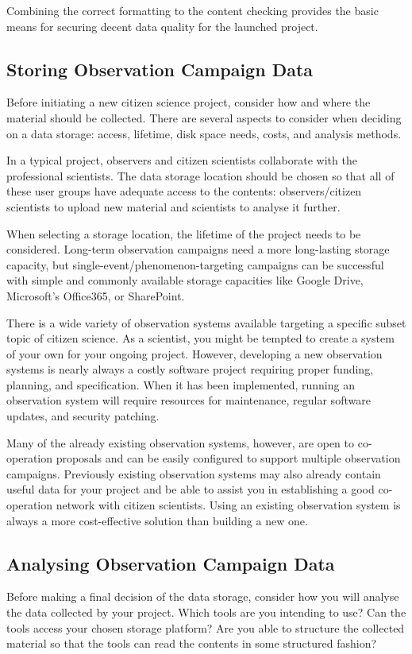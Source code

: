 \documentclass{article}
\newcommand{\contributed}[1]{%
    \par\noindent
    \begingroup
    \setlength{\leftskip}{1em}%
    \itshape
    Contributors: #1
    \par
    \endgroup
    \vspace{0.5em}
}
\begin{document}
Combining the correct formatting to the content checking provides the basic means for securing decent data quality for the launched project.

\subsection{Storing Observation Campaign Data}\label{data_storage}
Before initiating a new citizen science project, consider how and where the material should be collected. There are several aspects to consider when deciding on a data storage: access, lifetime, disk space needs, costs, and analysis methods. 

In a typical project, observers and citizen scientists collaborate with the professional scientists. The data storage location should be chosen so that all of these user groups have adequate access to the contents: observers/citizen scientists to upload new material and scientists to analyse it further.

When selecting a storage location, the lifetime of the project needs to be considered. Long-term observation campaigns need a more long-lasting storage capacity, but single-event/phenomenon-targeting campaigns can be successful with simple and commonly available storage capacities like Google Drive, Microsoft's Office365, or SharePoint.

There is a wide variety of observation systems available targeting a specific subset topic of citizen science. As a scientist, you might be tempted to create a system of your own for your ongoing project. However, developing a new observation systems is nearly always a costly software project requiring proper funding, planning, and specification. When it has been implemented, running an observation system will require resources for maintenance, regular software updates, and security patching. 

Many of the already existing observation systems, however, are open to co-operation proposals and can be easily configured to support multiple observation campaigns. Previously existing observation systems may also already contain useful data for your project and be able to assist you in establishing a good co-operation network with citizen scientists. Using an existing observation system is always a more cost-effective solution than building a new one. 

\subsection{Analysing Observation Campaign Data}\label{data_storage}
Before making a final decision of the data storage, consider how you will analyse the data collected by your project. Which tools are you intending to use? Can the tools access your chosen storage platform? Are you able to structure the collected material so that the tools can read the contents in some structured fashion?
\end{document}
